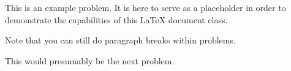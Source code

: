 \documentclass{homework}
\begin{document}
\thispagestyle{followingpage}
\begin{problem}{1.2}
This is an example problem. It is here to serve as a
placeholder in order to demonstrate the capabilities of this \LaTeX{}
document class.

Note that you can still do paragraph breaks within problems.
\end{problem}

\begin{problem}{1.3}
This would presumably be the next problem.
\end{problem}
\end{document}
